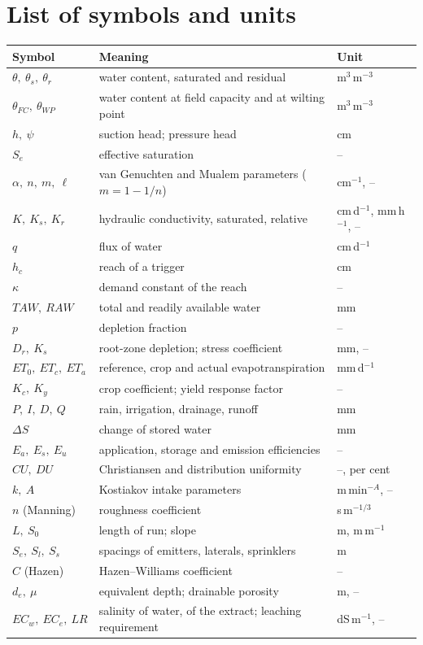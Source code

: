 \chapter*{List of symbols and units}
\small
\begin{longtable}{@{}p{}p{}p{}@{}}
\toprule\textbf{Symbol}&\textbf{Meaning}&\textbf{Unit}\\\midrule
$\theta,\ \theta_s,\ \theta_r$ & water content, saturated and residual & m$^3$\,m$^{-3}$\\
$\theta_{FC},\ \theta_{WP}$ & water content at field capacity and at wilting point & m$^3$\,m$^{-3}$\\
$h,\ \psi$ & suction head; pressure head & cm\\
$S_e$ & effective saturation & --\\
$\alpha,\ n,\ m,\ \ell$ & van Genuchten and Mualem parameters ($m=1-1/n$) & cm$^{-1}$, --\\
$K,\ K_s,\ K_r$ & hydraulic conductivity, saturated, relative & cm\,d$^{-1}$, mm\,h$^{-1}$, --\\
$q$ & flux of water & cm\,d$^{-1}$\\
$h_c$ & reach of a trigger & cm\\
$\kappa$ & demand constant of the reach & --\\
$TAW,\ RAW$ & total and readily available water & mm\\
$p$ & depletion fraction & --\\
$D_r,\ K_s$ & root-zone depletion; stress coefficient & mm, --\\
$ET_0,\ ET_c,\ ET_a$ & reference, crop and actual evapotranspiration & mm\,d$^{-1}$\\
$K_c,\ K_y$ & crop coefficient; yield response factor & --\\
$P,\ I,\ D,\ Q$ & rain, irrigation, drainage, runoff & mm\\
$\Delta S$ & change of stored water & mm\\
$E_a,\ E_s,\ E_u$ & application, storage and emission efficiencies & --\\
$CU,\ DU$ & Christiansen and distribution uniformity & --, per cent\\
$k,\ A$ & Kostiakov intake parameters & m\,min$^{-A}$, --\\
$n$ (Manning) & roughness coefficient & s\,m$^{-1/3}$\\
$L,\ S_0$ & length of run; slope & m, m\,m$^{-1}$\\
$S_e,\ S_l,\ S_s$ & spacings of emitters, laterals, sprinklers & m\\
$C$ (Hazen) & Hazen--Williams coefficient & --\\
$d_e,\ \mu$ & equivalent depth; drainable porosity & m, --\\
$EC_w,\ EC_e,\ LR$ & salinity of water, of the extract; leaching requirement & dS\,m$^{-1}$, --\\
\bottomrule\end{longtable}
\normalsize
\mainmatter
\pagestyle{fancy}

